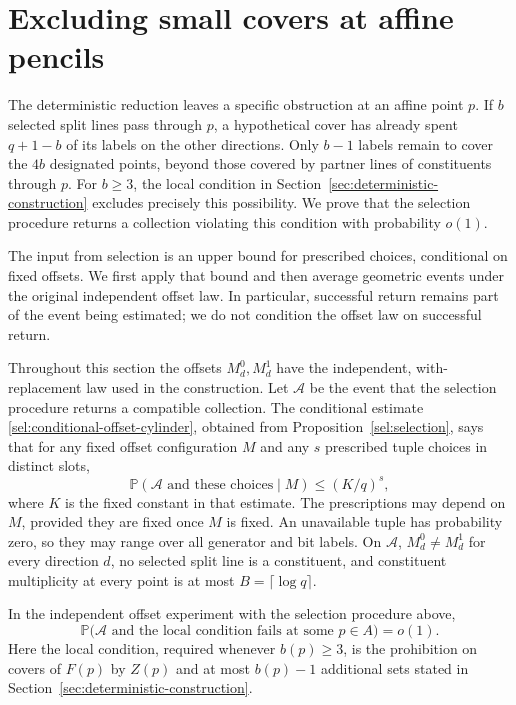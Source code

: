 \section{Excluding small covers at affine pencils}\label{sec:pencils}

The deterministic reduction leaves a specific obstruction at an affine
point $p$.  If $b$ selected split lines pass through $p$, a hypothetical
cover has already spent $q+1-b$ of its labels on the other directions.
Only $b-1$ labels remain to cover the $4b$ designated points, beyond those
covered by partner lines of constituents through $p$.  For $b\ge3$, the
local condition in Section~\ref{sec:deterministic-construction} excludes
precisely this possibility.  We prove that the selection procedure returns
a collection violating this condition with probability $o(1)$.

The input from selection is an upper bound for prescribed choices,
conditional on fixed offsets.  We first apply that bound and then average
geometric events under the original independent offset law.  In
particular, successful return remains part of the event being estimated;
we do not condition the offset law on successful return.

Throughout this section the offsets $M_d^0,M_d^1$ have the independent,
with-replacement law used in the construction.  Let $\mathcal A$ be the
event that the selection procedure returns a compatible collection.  The
conditional estimate \eqref{sel:conditional-offset-cylinder}, obtained
from Proposition~\ref{sel:selection}, says that for any fixed offset
configuration $M$ and any $s$ prescribed tuple choices in distinct slots,
\begin{equation}\label{eq:pencil-cylinder}
 \mathbb P(\mathcal A\text{ and these choices}\mid M)
       \le (K/q)^s,
\end{equation}
where $K$ is the fixed constant in that estimate.  The prescriptions may
depend on $M$, provided they are fixed once $M$ is fixed.  An unavailable
tuple has probability zero, so they may range over all generator and bit
labels.  On $\mathcal A$, $M_d^0\ne M_d^1$ for every direction $d$, no selected
split line is a constituent, and constituent multiplicity at every point
is at most $B=\lceil\log q\rceil$.

\begin{proposition}\label{prop:pencil-local}
In the independent offset experiment with the selection procedure above,
\[
 \mathbb P\bigl(\mathcal A\text{ and the local condition fails at some }
 p\in A\bigr)=o(1).
\]
Here the local condition, required whenever $b(p)\ge3$, is the prohibition
on covers of $F(p)$ by $Z(p)$ and at most $b(p)-1$ additional sets stated in
Section~\ref{sec:deterministic-construction}.
\end{proposition}

